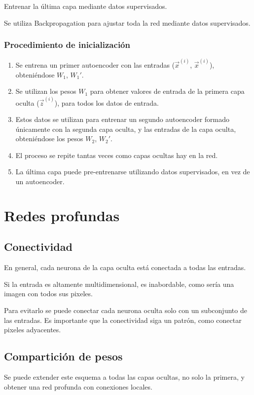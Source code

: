 \documentclass[12pt, twoside, openright]{report} %
\begin{document}
Entrenar la última capa mediante datos supervisados.

Se utiliza Backpropagation para ajustar toda la red mediante datos supervisados.
\pagebreak

\subsubsection{Procedimiento de inicialización}
\begin{enumerate}
	\item Se entrena un primer autoencoder con las entradas ($\vec{x}^{(i)}$, $\vec{x}^{(i)}$), obteniéndose $W_1$, $W_1'$.
	\item Se utilizan los pesos $W_1$ para obtener valores de entrada de la primera capa oculta ($\vec{z}^{(i)}$), para todos los datos de entrada.
	\item Estos datos se utilizan para entrenar un segundo autoencoder formado únicamente con la segunda capa oculta, y las entradas de la capa oculta, obteniéndose los pesos $W_2$, $W_2'$.
	\item El proceso se repite tantas veces como capas ocultas hay en la red.
	\item La última capa puede pre-entrenarse utilizando datos supervisados, en vez de un autoencoder.
\end{enumerate}

\section{Redes profundas}
\subsection{Conectividad}
En general, cada neurona de la capa oculta está conectada a todas las entradas.

Si la entrada es altamente multidimensional, es inabordable, como sería una imagen con todos sus pixeles.

Para evitarlo se puede conectar cada neurona oculta solo con un subconjunto de las entradas. Es importante que la conectividad siga un patrón, como conectar pixeles adyacentes.

\subsection{Compartición de pesos}
Se puede extender este esquema a todas las capas ocultas, no solo la primera, y obtener una red profunda con conexiones locales.
\end{document}
